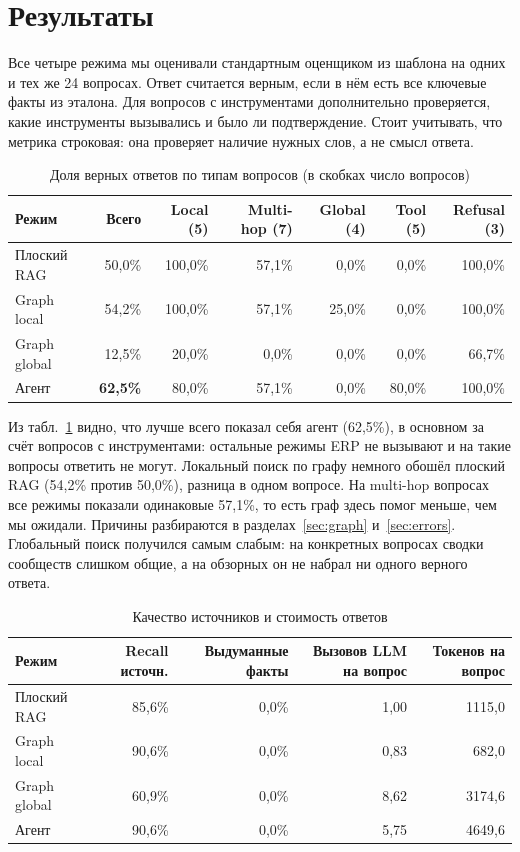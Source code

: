 \documentclass[a4paper,12pt]{article}
\begin{document}
\section{Результаты}

Все четыре режима мы оценивали стандартным оценщиком из шаблона на одних и тех же 24 вопросах. Ответ считается верным, если в нём есть все ключевые факты из эталона. Для вопросов с инструментами дополнительно проверяется, какие инструменты вызывались и было ли подтверждение. Стоит учитывать, что метрика строковая: она проверяет наличие нужных слов, а не смысл ответа.

\begin{table}[H]
\centering\small
\caption{Доля верных ответов по типам вопросов (в скобках число вопросов)}\label{tab:acc}
\setlength{\tabcolsep}{4pt}
\begin{tabular}{@{}lrrrrrr@{}}
\toprule
\textbf{Режим} & \textbf{Всего} & \textbf{Local (5)} & \textbf{Multi-hop (7)} & \textbf{Global (4)} & \textbf{Tool (5)} & \textbf{Refusal (3)}\\
\midrule
Плоский RAG  & 50,0\% & 100,0\% & 57,1\% & 0,0\%  & 0,0\%  & 100,0\%\\
Graph local  & 54,2\% & 100,0\% & 57,1\% & 25,0\% & 0,0\%  & 100,0\%\\
Graph global & 12,5\% & 20,0\%  & 0,0\%  & 0,0\%  & 0,0\%  & 66,7\%\\
Агент        & \textbf{62,5\%} & 80,0\% & 57,1\% & 0,0\% & 80,0\% & 100,0\%\\
\bottomrule
\end{tabular}
\end{table}

Из табл.~\ref{tab:acc} видно, что лучше всего показал себя агент (62,5\%), в основном за счёт вопросов с инструментами: остальные режимы ERP не вызывают и на такие вопросы ответить не могут. Локальный поиск по графу немного обошёл плоский RAG (54,2\% против 50,0\%), разница в одном вопросе. На multi-hop вопросах все режимы показали одинаковые 57,1\%, то есть граф здесь помог меньше, чем мы ожидали. Причины разбираются в разделах~\ref{sec:graph} и~\ref{sec:errors}. Глобальный поиск получился самым слабым: на конкретных вопросах сводки сообществ слишком общие, а на обзорных он не набрал ни одного верного ответа.

\begin{table}[H]
\centering\small
\caption{Качество источников и стоимость ответов}\label{tab:cost}
\begin{tabularx}{\linewidth}{@{}lRRRR@{}}
\toprule
\textbf{Режим} & \textbf{Recall источн.} & \textbf{Выдуманные факты} & \textbf{Вызовов LLM на вопрос} & \textbf{Токенов на вопрос}\\
\midrule
Плоский RAG  & 85,6\% & 0,0\% & 1,00 & 1115,0\\
Graph local  & 90,6\% & 0,0\% & 0,83 & 682,0\\
Graph global & 60,9\% & 0,0\% & 8,62 & 3174,6\\
Агент        & 90,6\% & 0,0\% & 5,75 & 4649,6\\
\bottomrule
\end{tabularx}
\end{table}
\end{document}
